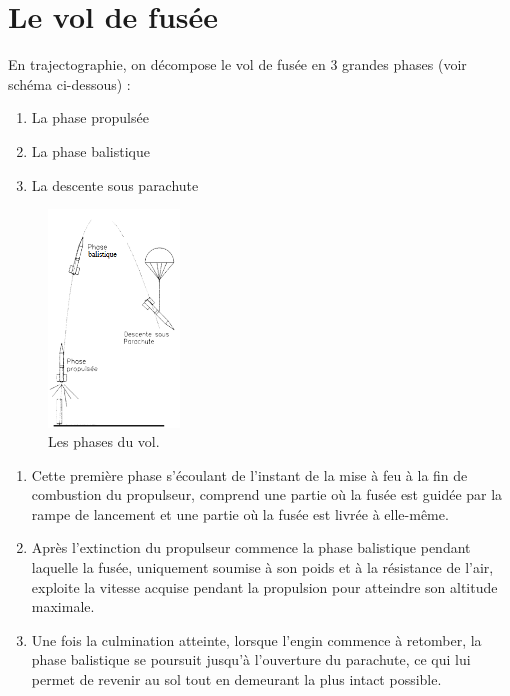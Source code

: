 \documentclass[a4paper]{article}
\begin{document}
\section{Le vol de fusée}

En trajectographie, on décompose le vol de fusée en 3 grandes phases (voir schéma ci-dessous) : 

\begin{enumerate}
\item La phase propulsée
\item La phase balistique
\item La descente sous parachute
\end{enumerate}

\begin{figure}[!htbp]
\begin{center}
\includegraphics[width=3.5cm]{phases_vol.PNG} 
\end{center}
\caption{Les phases du vol.}
\end{figure}


\begin{enumerate}
\item Cette première phase s'écoulant  de  l'instant  de  la  mise à  feu à  la  fin  de  combustion  du  propulseur, comprend  une  partie  où  la  fusée  est  
guidée par la rampe de lancement et une partie où la fusée est livrée à elle-même. 
\item Après l'extinction du propulseur commence la  phase  balistique
  pendant  laquelle  la  fusée,  
uniquement soumise à son poids et à la résistance 
de l'air, exploite la vitesse acquise pendant la propulsion pour atteindre son altitude maximale. 
\item Une fois la culmination atteinte, lorsque l'engin commence à retomber, la phase balistique se 
poursuit  jusqu'à l'ouverture  du  parachute,  ce  qui  lui  permet  
de  revenir  au  sol  tout  en  
demeurant la plus intact possible. \\  
\end{enumerate} 
\end{document}
